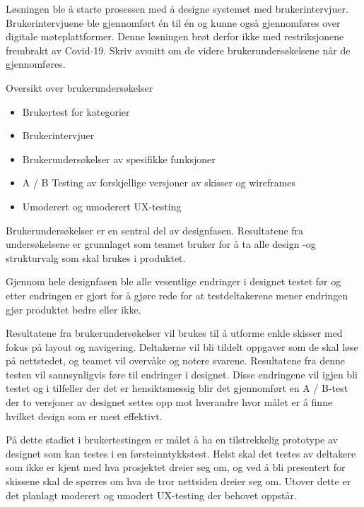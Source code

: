 Løsningen ble å starte prosessen med å designe systemet med brukerintervjuer. Brukerintervjuene ble gjennomført én til én og kunne også gjennomføres over digitale møteplattformer. Denne løsningen brøt derfor ikke med restriksjonene frembrakt av Covid-19.\newline
Skriv avsnitt om de videre brukerundersøkelsene når de gjennomføres.\newline

Oversikt over brukerundersøkelser
\begin{itemize}
\item Brukertest for kategorier
\item Brukerintervjuer
\item Brukerundersøkelser av spesifikke funksjoner
\item A / B Testing av forskjellige versjoner av skisser og wireframes
\item Umoderert og umoderert UX-testing
\end{itemize}

Brukerundersøkelser er en sentral del av designfasen. Resultatene fra undersøkelsene er grunnlaget som teamet bruker for å ta alle design -og strukturvalg som skal brukes i produktet.\newline 

Gjennom hele designfasen ble alle vesentlige endringer i designet testet før og etter endringen er gjort for å gjøre rede for at testdeltakerene mener endringen gjør produktet bedre eller ikke.

Resultatene fra brukerundersøkelser vil brukes til å utforme enkle skisser med fokus på layout og navigering. Deltakerne vil bli tildelt oppgaver som de skal løse på nettstedet, og teamet vil overvåke og notere svarene. Resultatene fra denne testen vil sannsynligvis føre til endringer i designet. Disse endringene vil igjen bli testet og i tilfeller der det er hensiktsmessig blir det gjennomført en A / B-test der to versjoner av designet settes opp mot hverandre hvor målet er å finne hvilket design som er mest effektivt.\newline

På dette stadiet i brukertestingen er målet å ha en tilstrekkelig prototype av designet som kan testes i en førsteinntykkstest. Helst skal det testes av deltakere som ikke er kjent med hva prosjektet dreier seg om, og ved å bli presentert for skissene skal de spørres om hva de tror nettsiden dreier seg om.\newline
Utover dette er det planlagt moderert og umodert UX-testing der behovet oppstår.

